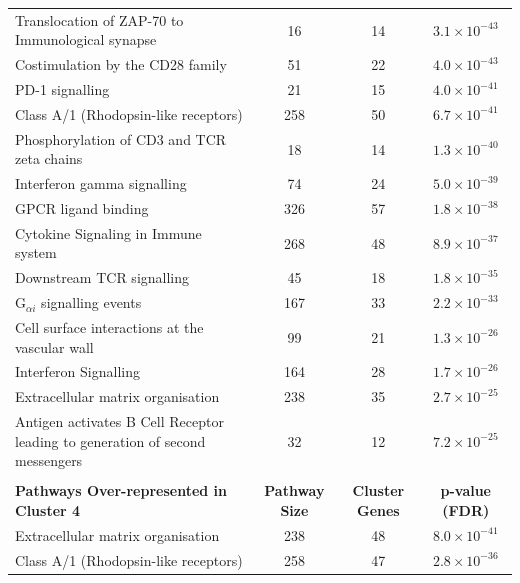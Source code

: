 \begin{table}[!hp]
{\begin{tabular}{lccc}
  \rowcolor{Cluster_Orange!30} 
  Translocation of ZAP-70 to Immunological synapse &  16 &  14 & $3.1 \times 10^{-43}$ \\
  \rowcolor{Cluster_Orange!20} 
  Costimulation by the CD28 family &  51 &  22 & $4.0 \times 10^{-43}$ \\
  \rowcolor{Cluster_Orange!30} 
  PD-1 signalling &  21 &  15 & $4.0 \times 10^{-41}$ \\
  \rowcolor{Cluster_Orange!20} 
  Class A/1 (Rhodopsin-like receptors) & 258 &  50 & $6.7 \times 10^{-41}$ \\
  \rowcolor{Cluster_Orange!30} 
  Phosphorylation of CD3 and TCR zeta chains &  18 &  14 & $1.3 \times 10^{-40}$ \\
  \rowcolor{Cluster_Orange!20} 
  Interferon gamma signalling &  74 &  24 & $5.0 \times 10^{-39}$ \\
  \rowcolor{Cluster_Orange!30} 
  GPCR ligand binding & 326 &  57 & $1.8 \times 10^{-38}$ \\
  \rowcolor{Cluster_Orange!20} 
  Cytokine Signaling in Immune system & 268 &  48 & $8.9 \times 10^{-37}$ \\
  \rowcolor{Cluster_Orange!30} 
  Downstream TCR signalling &  45 &  18 & $1.8 \times 10^{-35}$ \\
  \rowcolor{Cluster_Orange!20} 
  G$_{\alpha i}$ signalling events & 167 &  33 & $2.2 \times 10^{-33}$ \\
  \rowcolor{Cluster_Orange!30} 
  Cell surface interactions at the vascular wall &  99 &  21 & $1.3 \times 10^{-26}$ \\
  \rowcolor{Cluster_Orange!20} 
  Interferon Signalling & 164 &  28 & $1.7 \times 10^{-26}$ \\
  \rowcolor{Cluster_Orange!30} 
  Extracellular matrix organisation & 238 &  35 & $2.7 \times 10^{-25}$ \\
  \rowcolor{Cluster_Orange!20} 
  Antigen activates B Cell Receptor leading to generation of second messengers &  32 &  12 & $7.2 \times 10^{-25}$ \\
   \hline
  \\ 
  \cellcolor{white} \large{\textbf{Pathways Over-represented in Cluster 4}} & \large{\textbf{Pathway Size}} & \large{\textbf{Cluster Genes}} & \large{\textbf{p-value (FDR)}} \\ %
  \hline 
  \rowcolor{Cluster_Red!20}
  Extracellular matrix organisation & 238 &  48 & $8.0 \times 10^{-41}$ \\
  \rowcolor{Cluster_Red!15} 
  Class A/1 (Rhodopsin-like receptors) & 258 &  47 & $2.8 \times 10^{-36}$ \\

\end{tabular}}
\end{table}
